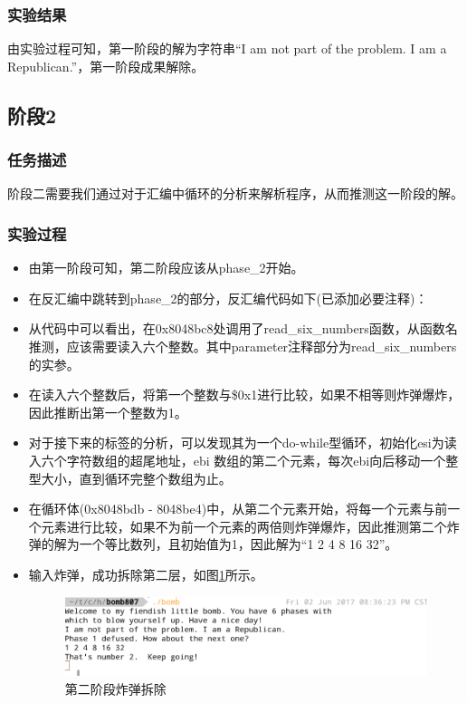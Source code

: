 \subsubsection{实验结果}
由实验过程可知，第一阶段的解为字符串``I am not part of the problem. I am a Republican.''，第一阶段成果解除。

\subsection{阶段2}
\subsubsection{任务描述}
阶段二需要我们通过对于汇编中循环的分析来解析程序，从而推测这一阶段的解。

\subsubsection{实验过程}
\begin{itemize}
	\item 由第一阶段可知，第二阶段应该从phase\_2开始。
	\item 在反汇编中跳转到phase\_2的部分，反汇编代码如下(已添加必要注释)：
		\begin{codeFont}
			
		\end{codeFont}
	\item 从代码中可以看出，在0x8048bc8处调用了read\_six\_numbers函数，从函数名推测，应该需要读入六个整数。其中parameter注释部分为read\_six\_numbers的实参。
	\item 在读入六个整数后，将第一个整数与\$0x1进行比较，如果不相等则炸弹爆炸，因此推断出第一个整数为1。
	\item 对于接下来的标签的分析，可以发现其为一个do-while型循环，初始化esi为读入六个字符数组的超尾地址，ebi 数组的第二个元素，每次ebi向后移动一个整型大小，直到循环完整个数组为止。
	\item 在循环体(0x8048bdb - 8048be4)中，从第二个元素开始，将每一个元素与前一个元素进行比较，如果不为前一个元素的两倍则炸弹爆炸，因此推测第二个炸弹的解为一个等比数列，且初始值为1，因此解为``1 2 4 8 16 32''。
	\item 输入炸弹，成功拆除第二层，如图\ref{fig:fig3}所示。
		\begin{figure}[H]
			\centering
			\includegraphics[width=0.95\linewidth]{resources/fig3.png}
			\caption{第二阶段炸弹拆除}
			\label{fig:fig3}
		\end{figure}
\end{itemize}

